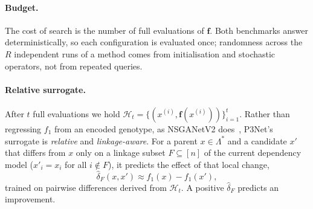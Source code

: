 \paragraph{Budget.} The cost of search is the number of full evaluations of $\mathbf{f}$. Both benchmarks answer
deterministically, so each configuration is evaluated once; randomness across the $R$ independent runs of a
method comes from initialisation and stochastic operators, not from repeated queries.

\paragraph{Relative surrogate.} After $t$ full evaluations we hold
$\mathcal{H}_t = \{ (x^{(i)}, \mathbf{f}(x^{(i)})) \}_{i=1}^{t}$. Rather than regressing $f_1$ from an encoded
genotype, as NSGANetV2 does~\citep{lu2020nsganetv2}, P3Net's surrogate is \emph{relative} and
\emph{linkage-aware}. For a parent $x \in \Lambda^*$ and a candidate $x'$ that differs from $x$ only on a
linkage subset $F \subseteq [n]$ of the current dependency model ($x'_i = x_i$ for all $i \notin F$), it
predicts the effect of that local change,
\[
    \hat{\delta}_F(x, x') \approx f_1(x) - f_1(x'),
\]
trained on pairwise differences derived from $\mathcal{H}_t$. A positive $\hat\delta_F$ predicts an improvement.
